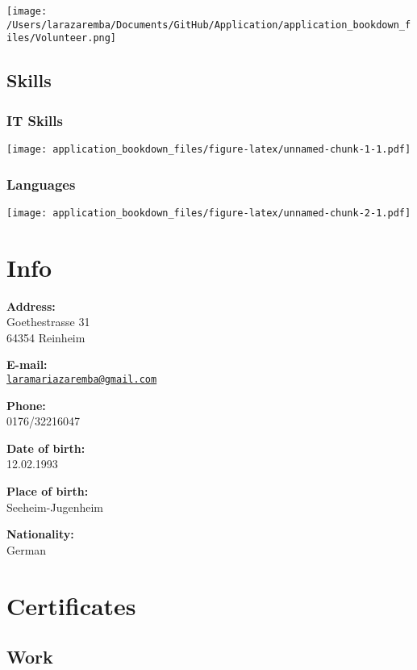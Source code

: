 \documentclass[
]{book}
\begin{document}
\texttt{[image: /Users/larazaremba/Documents/GitHub/Application/application\_bookdown\_files/Volunteer.png]}

\hypertarget{skills}{%
\section{Skills}\label{skills}}

\hypertarget{it-skills}{%
\subsection{IT Skills}\label{it-skills}}

\texttt{[image: application\_bookdown\_files/figure-latex/unnamed-chunk-1-1.pdf]}

\hypertarget{languages}{%
\subsection{Languages}\label{languages}}

\texttt{[image: application\_bookdown\_files/figure-latex/unnamed-chunk-2-1.pdf]}

\hypertarget{info}{%
\chapter{Info}\label{info}}

\textbf{Address:}\\
Goethestrasse 31\\
64354 Reinheim

\textbf{E-mail:}\\
\href{mailto:laramariazaremba@gmail.com}{\nolinkurl{laramariazaremba@gmail.com}}

\textbf{Phone:}\\
0176/32216047

\textbf{Date of birth:}\\
12.02.1993

\textbf{Place of birth:}\\
Seeheim-Jugenheim

\textbf{Nationality:}\\
German

\hypertarget{certificates}{%
\chapter{Certificates}\label{certificates}}

\hypertarget{work}{%
\section{Work}\label{work}}
\end{document}
